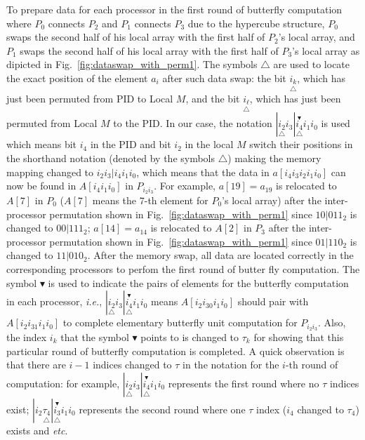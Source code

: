 \documentclass{iacrtrans}
\theoremstyle{plain}
\begin{document}
To prepare data for each processor in the first round of butterfly computation where $P_0$ connects $P_2$ and $P_1$ connects $P_3$ due to the hypercube structure, $P_0$ swaps the  second half of his local array with the first half of $P_2$'s local array, and $P_1$ swaps the second half of his local array with the first half of $P_3$'s local array as dipicted in Fig.~\ref{fig:dataswap_with_perm1}. The symbols $\triangle$ are used to locate the exact position of the element $a_i$ after such data swap: the bit $\underset{\triangle}{i_k}$, which has just been permuted from PID to Local $M$, and the bit $\underset{\triangle}{i_{\ell}}$, which has just been permuted from Local $M$ to the PID. In our case, the notation $|\underset{\triangle}{i_2}i_3|\overset{\blacktriangledown}{\underset{\triangle}{i_4}}i_1i_0$ is used which means bit $i_4$ in the PID and bit $i_2$ in the local $M$ switch their positions in the shorthand notation (denoted by the symbols $\triangle$) making the memory mapping changed to $i_2i_3|i_4i_1i_0$, which means that the data in $a[i_4i_3i_2i_1i_0]$ can now be found in $A[i_4i_1i_0]$ in $P_{i_2i_3}$. For example, $a[19]=a_{19}$ is relocated to $A[7]$  in $P_0$ ($A[7]$ means the 7-th element for $P_0$'s local array) after the inter-processor permutation shown in Fig.~\ref{fig:dataswap_with_perm1} since $10|011_2$ is changed to $00|111_2$; $a[14]=a_{14}$ is relocated to $A[2]$ in $P_3$ after the inter-processor permutation shown in Fig.~\ref{fig:dataswap_with_perm1} since $01|110_2$ is changed to $11|010_2$. After the memory swap, all data are located correctly in the corresponding processors to perfom the first round of butter fly computation. The symbol $\blacktriangledown$ is used to indicate the pairs of elements for the butterfly computation in each processor, \textit{i.e.},
$|\underset{\triangle}{i_2}i_3|\overset{\blacktriangledown}{\underset{\triangle}{i_4}}i_1i_0$ means $A[i_2i_30i_1i_0]$ should pair with $A[i_2i_31i_1i_0]$ to complete elementary butterfly unit computation for $P_{i_2i_3}$. Also, the index $i_k$ that the symbol $\blacktriangledown$ points to is changed to $\tau_k$ for showing that this particular round of butterfly computation is completed. A  quick observation is that there are $i-1$ indices changed to $\tau$ in the notation for the $i$-th round of computation: for example, $|\underset{\triangle}{i_2}i_3|\overset{\blacktriangledown}{\underset{\triangle}{i_4}}i_1i_0$ represents the first round where no $\tau$ indices exist; $|i_2\underset{\triangle}{\tau_4}|\overset{\blacktriangledown}{\underset{\triangle}{i_3}}i_1i_0$ represents the second round where one $\tau$ index ($i_4$ changed to $\tau_4$) exists and \textit{etc}.
\end{document}
